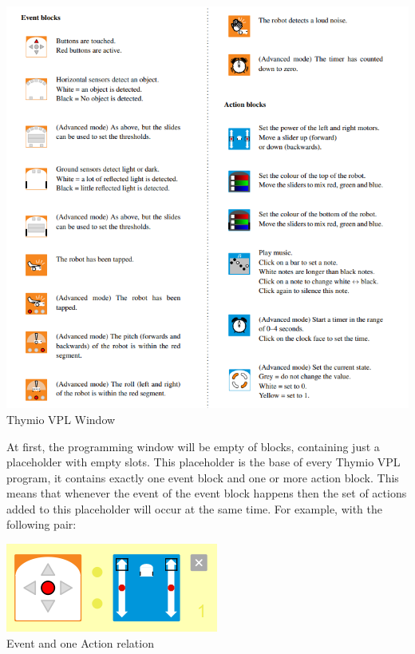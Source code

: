 \documentclass{scrbook}
\begin{document}
\begin{center}
  \includegraphics[width=\textwidth]{./VPL/Thymio_blocks}
  Thymio VPL Window
\end{center}

At first, the programming window will be empty of blocks, containing just a placeholder with empty slots. 
This placeholder is the base of every Thymio VPL program, it contains exactly one event block and one or more action block. 
This means that whenever the event of the event block happens then the set of actions added to this placeholder will occur at the same time. 
For example, with the following pair: \\
\begin{center}
  \includegraphics[scale=0.5]{./VPL/middlebtn_forward}\\
  Event and one Action relation
\end{center}
\end{document}
